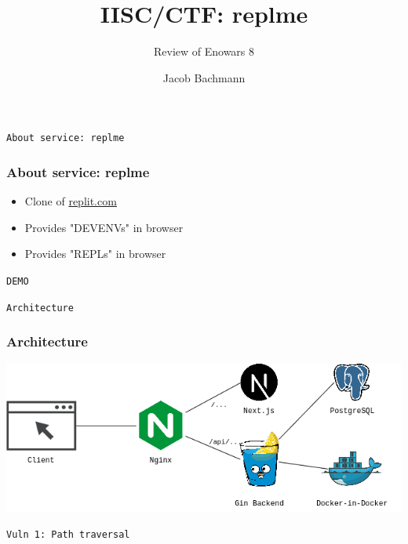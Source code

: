 \documentclass[10pt]{beamer}
\title{IISC/CTF: replme}
\subtitle{Review of Enowars 8}
\author{Jacob Bachmann}
\institute
{
  SecT\\
  TU Berlin
}
\begin{document}
\frame{\titlepage}

\begin{frame}
	\begin{center}
		\LARGE{\texttt{About service: replme}}
	\end{center}
\end{frame}

\begin{frame}
	\frametitle{About service: replme}
	\begin{itemize}
		\item<1-> Clone of \href{http://replit.com}{replit.com}
		\item<2-> Provides "DEVENVs" in browser
		\item<3-> Provides "REPLs" in browser
	\end{itemize}
\end{frame}

\begin{frame}
	\begin{center}
		\LARGE{\texttt{DEMO}}
	\end{center}
\end{frame}

\begin{frame}
	\begin{center}
		\LARGE{\texttt{Architecture}}
	\end{center}
\end{frame}

\begin{frame}
	\frametitle{Architecture}
	\includegraphics[scale=.45]{arch.drawio}
\end{frame}

\begin{frame}
	\begin{center}
		\LARGE{\texttt{Vuln 1: Path traversal}}
	\end{center}
\end{frame}
\end{document}
